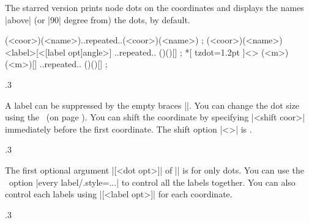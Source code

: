The starred version \icmd{\tzcoorsquick*} prints node dots on the coordinates and displays the names |above| (or |90| degree from) the dots, by default.

\begin{tzdef}{}
\tzcoorsquick*(<coor>)(<name>)..repeated..(<coor>)(<name>) ;
(<coor>)(<name>){<label>}[<[label opt]angle>]
                                     ..repeated.. ()(){}[] ;
 *[ tzdot=1.2pt ]<> (<m>)(<m>){}[] ..repeated.. ()(){}[] ;
\end{tzdef}

\begin{tzcode}{.3}
{}
\end{tzcode}

A label can be suppressed by the empty braces |{}|.
You can change the dot size using the \threeways\ (on page \pageref{ss:threeways}).
You can shift the coordinate by specifying |<shift coor>| immediately before the first coordinate. The  shift option |<>| is .

\begin{tzcode}{.3}
\end{tzcode}

\remark
The first optional argument |[<dot opt>]| of |\tzcoorsquick*| is for only dots.
You can use the \Tikz\ option |every label/.style={...}| to control all the labels together.
You can also control each labels using |[<label opt>]| for each coordinate.

\begin{tzcode}{.3}
\end{tzcode}


